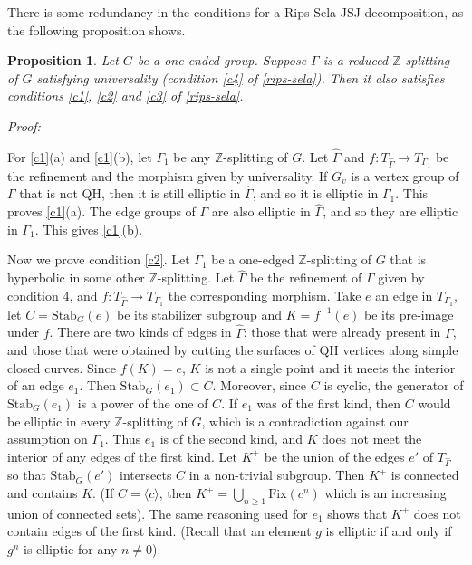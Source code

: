 \documentclass[12pt]{amsart}
\newtheorem{proposition}[theorem]{Proposition}
\newcommand{\Z}{\mathbb{Z}}
\newcommand{\Stab}{\mbox{Stab}}
\begin{document}
There is some redundancy in the conditions for a Rips-Sela JSJ decomposition, as the following proposition shows.

\begin{proposition} \label{universality0} Let $G$ be a one-ended group. Suppose $\Gamma$ is a reduced $\Z$-splitting of $G$ satisfying universality (condition \ref{c4} of \ref{rips-sela}). Then it also satisfies conditions \ref{c1}, \ref{c2} and \ref{c3} of \ref{rips-sela}.
\end{proposition}


{\em Proof:}


For \ref{c1}(a) and \ref{c1}(b), let $\Gamma_1$ be any $\Z$-splitting of $G$. Let $\hat \Gamma$ and $f:T_{\hat\Gamma}\to T_{\Gamma_1}$ be the refinement and the morphism given by universality. If $G_v$ is a vertex group of $\Gamma$ that is not QH, then it is still elliptic in $\hat\Gamma$, and so it is elliptic in $\Gamma_1$. This proves \ref{c1}(a). The edge groups of $\Gamma$ are also elliptic in $\hat\Gamma$, and so they are elliptic in $\Gamma_1$. This gives \ref{c1}(b).

Now we prove condition \ref{c2}. Let $\Gamma_1$ be a one-edged $\Z$-splitting of $G$ that is hyperbolic in some other $\Z$-splitting. Let $\hat \Gamma$ be the refinement of $\Gamma$ given by condition 4, and $f:T_{\hat \Gamma} \to T_{\Gamma_1}$ the corresponding morphism. Take $e$ an edge in $T_{\Gamma_1}$, let $C=\Stab_G(e)$ be its stabilizer subgroup and $K=f^{-1}(e)$ be its pre-image under $f$. There are two kinds of edges in $\hat \Gamma$: those that were already present in $\Gamma$, and those that were obtained by cutting the surfaces of QH vertices along simple closed curves. Since $f(K)=e$, $K$ is not a single point and it meets the interior of an edge $e_1$. Then $\Stab_G(e_1)\subset C$. Moreover, since $C$ is cyclic, the generator of $\Stab_G(e_1)$ is a power of the one of $C$. If $e_1$ was of the first kind, then $C$ would be elliptic in every $\Z$-splitting of $G$, which is a contradiction against our assumption on $\Gamma_1$. Thus $e_1$ is of the second kind, and $K$ does not meet the interior of any edges of the first kind. Let $K^+$ be the union of the edges $e'$ of $T_{\hat \Gamma}$ so that $\Stab_G(e')$ intersects $C$ in a non-trivial subgroup. Then $K^+$ is connected and contains $K$. (If $C=\langle c \rangle$, then $K^+ = \bigcup_{n\geq 1}\mbox{Fix}(c^n)$ which is an increasing union of connected sets). The same reasoning used for $e_1$ shows that $K^+$ does not contain edges of the first kind. (Recall that an element $g$ is elliptic if and only if $g^n$ is elliptic for any $n\neq 0$).
\end{document}

